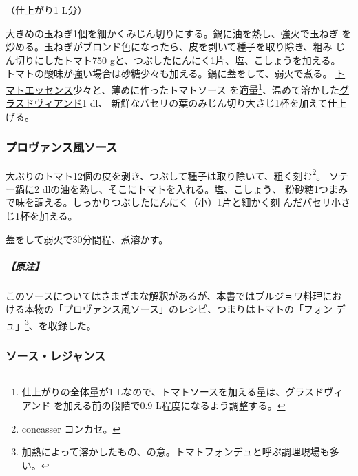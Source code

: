 \begin{recette}
（仕上がり1 L分）

大きめの玉ねぎ1個を細かくみじん切りにする。鍋に油を熱し、強火で玉ねぎ
を炒める。玉ねぎがブロンド色になったら、皮を剥いて種子を取り除き、粗み
じん切りにしたトマト750 gと、つぶしたにんにく1片、塩、こしょうを加える。
トマトの酸味が強い場合は砂糖少々も加える。鍋に蓋をして、弱火で煮る。
\protect\hyperlink{essences-diverses}{トマトエッセンス}少々と、薄めに作ったトマトソース
を適量\footnote{仕上がりの全体量が1
  Lなので、トマトソースを加える量は、グラスドヴィアンド
  を加える前の段階で0.9 L程度になるよう調整する。}、温めて溶かした\protect\hyperlink{glace-de-viande}{グラスドヴィアンド}1
dl、 新鮮なパセリの葉のみじん切り大さじ1杯を加えて仕上げる。

\hypertarget{sauce-provencal}{%
\subsubsection{プロヴァンス風ソース}\label{sauce-provencal}}



大ぶりのトマト12個の皮を剥き、つぶして種子は取り除いて、粗く刻む\footnote{concasser
  コンカセ。}。 ソテー鍋に2\undemi{}
dlの油を熱し、そこにトマトを入れる。塩、こしょう、
粉砂糖1つまみで味を調える。しっかりつぶしたにんにく（小）1片と細かく刻
んだパセリ小さじ1杯を加える。

蓋をして弱火で30分間程、煮溶かす。

\hypertarget{nota-sauce-provencale}{%
\subparagraph{【原注】}\label{nota-sauce-provencale}}

このソースについてはさまざまな解釈があるが、本書ではブルジョワ料理にお
ける本物の「プロヴァンス風ソース」のレシピ、つまりはトマトの「フォン
デュ」\footnote{加熱によって溶かしたもの、の意。トマトフォンデュと呼ぶ調理現場も多い。}、を収録した。

\hypertarget{sauce-regence}{%
\subsubsection{ソース・レジャンス}\label{sauce-regence}}


\end{recette}
